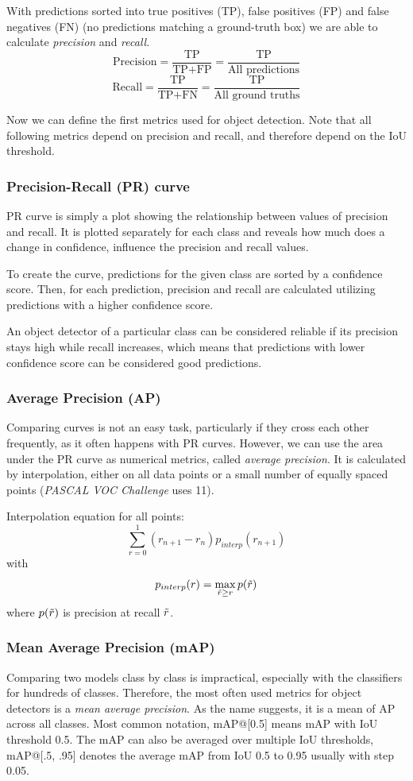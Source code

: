With predictions sorted into true positives (TP), false positives (FP) and false negatives (FN) (no predictions matching a ground-truth box) we are able to calculate \textit{precision} and \textit{recall}.
$$\text{Precision} = \frac{\text{TP}}{\text{TP}+\text{FP}} = \frac{\text{TP}}{\text{All predictions}}$$
$$\text{Recall} = \frac{\text{TP}}{\text{TP}+\text{FN}} = \frac{\text{TP}}{\text{All ground truths}}$$

Now we can define the first metrics used for object detection. Note that all following metrics depend on precision and recall, and therefore depend on the IoU threshold.

\subsubsection{Precision-Recall (PR) curve}
PR curve is simply a plot showing the relationship between values of precision and recall. It is plotted separately for each class and reveals how much does a change in confidence, influence the precision and recall values. 

To create the curve, predictions for the given class are sorted by a confidence score. Then, for each prediction, precision and recall are calculated utilizing predictions with a higher confidence score. 

An object detector of a particular class can be considered reliable if its precision stays high while recall increases, which means that predictions with lower confidence score can be considered good predictions.

\subsubsection{Average Precision (AP)}
Comparing curves is not an easy task, particularly if they cross each other frequently, as it often happens with PR curves. However, we can use the area under the PR curve as numerical metrics, called \textit{average precision}. It is calculated by interpolation, either on all data points or a small number of equally spaced points (\textit{PASCAL VOC Challenge} uses 11).

Interpolation equation for all points:
$$\sum_{r=0}^1 (r_{n+1} - r_n ) p_{interp}(r_{n+1})$$
with
$$p_{interp}(r) = \max_{\Tilde{r} \geq r} p(\Tilde{r})$$
where $p(\Tilde{r})$ is precision at recall $\Tilde{r}$.

\subsubsection{Mean Average Precision (mAP)}
Comparing two models class by class is impractical, especially with the classifiers for hundreds of classes. Therefore, the most often used metrics for object detectors is a \textit{mean average precision}. As the name suggests, it is a mean of AP across all classes. Most common notation, mAP@[0.5] means mAP with IoU threshold 0.5. The mAP can also be averaged over multiple IoU thresholds, mAP@[.5, .95] denotes the average mAP from IoU 0.5 to 0.95 usually with step 0.05.

